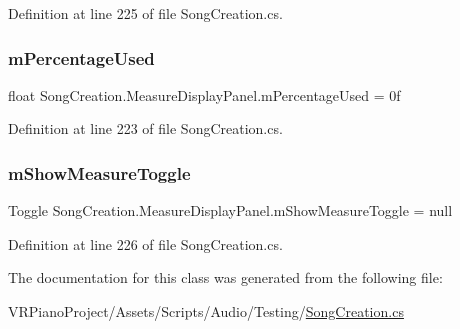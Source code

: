 Definition at line 225 of file Song\+Creation.\+cs.

\mbox{\label{class_song_creation_1_1_measure_display_panel_a87241a464e8e3ed8ad9011fcebaec50a}} 
\subsubsection{\texorpdfstring{m\+Percentage\+Used}{mPercentageUsed}}
{\footnotesize\ttfamily float Song\+Creation.\+Measure\+Display\+Panel.\+m\+Percentage\+Used = 0f\hspace{0.3cm}{\ttfamily [private]}}



Definition at line 223 of file Song\+Creation.\+cs.

\mbox{\label{class_song_creation_1_1_measure_display_panel_abe01653518d60c345faa462ccf979a55}} 
\subsubsection{\texorpdfstring{m\+Show\+Measure\+Toggle}{mShowMeasureToggle}}
{\footnotesize\ttfamily Toggle Song\+Creation.\+Measure\+Display\+Panel.\+m\+Show\+Measure\+Toggle = null\hspace{0.3cm}{\ttfamily [private]}}



Definition at line 226 of file Song\+Creation.\+cs.



The documentation for this class was generated from the following file\+:\begin{DoxyCompactItemize}
\item 
V\+R\+Piano\+Project/\+Assets/\+Scripts/\+Audio/\+Testing/\hyperlink{_song_creation_8cs}{Song\+Creation.\+cs}\end{DoxyCompactItemize}
